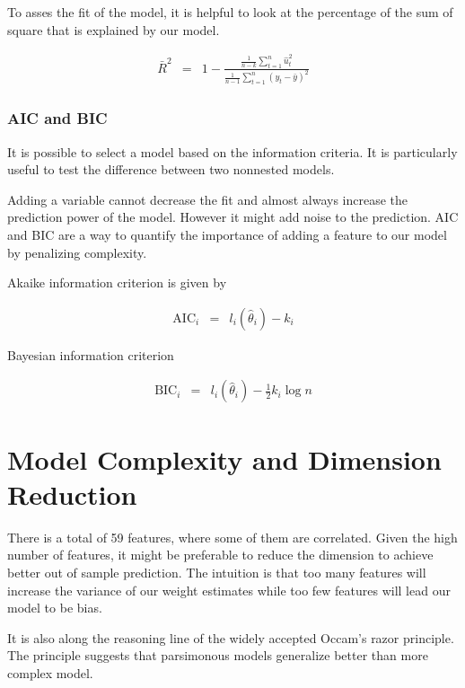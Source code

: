 \documentclass[conference]{IEEEtran}\usepackage[]{graphicx}\usepackage[]{color}
\begin{document}
To asses the fit of the model, it is helpful to look at the percentage of the
sum of square that is explained by our model.

\begin{eqnarray*}
  \bar{R}^2 &=& 1 - \frac{\frac{1}{n-k}\sum_{t=1}^n
                \hat{u}_t^2}{\frac{1}{n-1}\sum_{t=1}^n (y_t-\bar{y})^2}
\end{eqnarray*}
\cite{davidson2004econometric}
\subsubsection{AIC and BIC}

It is possible to select a model based on the information criteria. It is
particularly useful to test the difference between two nonnested models.


Adding a variable cannot decrease the fit and almost always increase the
prediction power of the model. However it might add noise to the prediction. AIC
and BIC are a way to quantify the importance of adding a feature to our model by
penalizing complexity.

Akaike information criterion is given by

\begin{eqnarray*}
  \text{AIC}_i &=& l_i(\hat{\theta}_i) - k_i
\end{eqnarray*}

Bayesian information criterion

\begin{eqnarray*}
  \text{BIC}_i &=& l_i(\hat{\theta}_i) - \frac{1}{2} k_i \log n
\end{eqnarray*}


\cite{davidson2004econometric}

\section{Model Complexity and Dimension Reduction}

There is a total of 59 features, where some of them are correlated. Given the
high number of features, it might be preferable to reduce the dimension to
achieve better out of sample prediction. The intuition is that too many
features will increase the variance of our weight estimates while too few
features will lead our model to be bias.

It is also along the reasoning line of the widely accepted Occam's razor
principle. The principle suggests that parsimonous models generalize better than
more complex model.  
\end{document}
